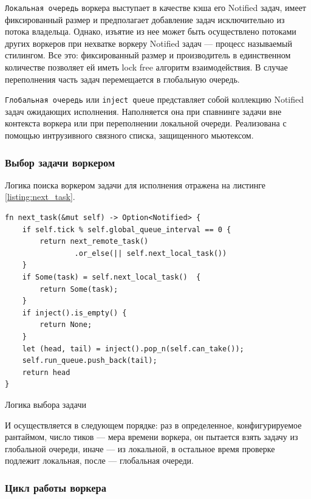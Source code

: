 \verb|Локальная очередь| воркера выступает в качестве кэша его Notified задач, имеет фиксированный размер и предполагает добавление задач исключительно из потока владельца. Однако, изъятие из нее может быть осуществлено потоками других воркеров при нехватке воркеру Notified задач --- процесс называемый стилингом. Все это: фиксированный размер и производитель в единственном количестве позволяет ей иметь lock free алгоритм взаимодействия. В случае переполнения часть задач перемещается в глобальную очередь.

\verb|Глобальная очередь| или \verb|inject queue| представляет собой коллекцию Notified задач ожидающих исполнения. Наполняется она при спавнинге задачи вне контекста воркера или при переполнении локальной очереди. Реализована с помощью интрузивного связного списка, защищенного мьютексом.

\subsubsection{Выбор задачи воркером}

Логика поиска воркером задачи для исполнения отражена на листинге \ref{listing:next_task}.

\begin{listing}[H]
    \begin{verbatim}
fn next_task(&mut self) -> Option<Notified> {
    if self.tick % self.global_queue_interval == 0 {
        return next_remote_task()
                .or_else(|| self.next_local_task())
    }
    if Some(task) = self.next_local_task()  {
        return Some(task);
    }
    if inject().is_empty() {
        return None;
    }
    let (head, tail) = inject().pop_n(self.can_take());
    self.run_queue.push_back(tail);
    return head
}
    \end{verbatim}

    \caption{Логика выбора задачи}
    \label{listing:next_task}
\end{listing}

И осуществляется в следующем порядке: раз в определенное, конфигурируемое рантаймом, число тиков --- мера времени воркера, он пытается взять задачу из глобальной очереди, иначе --- из локальной, в остальное время проверке подлежит локальная, после --- глобальная очереди.

\subsubsection{Цикл работы воркера}

